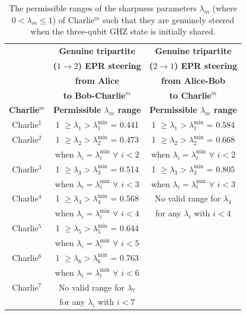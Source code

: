 \documentclass[pra,a4paper,aps,twocolumn,showpacs,superscriptaddress,groupedaddress]{revtex4}
\begin{document}
{\centering
	\begin{table}[t]\footnotesize
			\begin{tabular}{|c | c || c |} 
				\hline 
				& \textbf{Genuine tripartite} & \textbf{Genuine tripartite} \\
				& \textbf{($1 \rightarrow 2$) EPR steering} & \textbf{($2 \rightarrow 1$) EPR steering} \\
				& \textbf{from Alice} & \textbf{from Alice-Bob} \\
				& \textbf{to Bob-Charlie$^m$} & \textbf{to Charlie$^m$}\\
				\hline
				{\bf Charlie$^m$} & {\bf Permissible $\lambda_{m}$ range}  & {\bf Permissible $\lambda_{m}$ range}  \\ [0.5ex] 
				\hline
				\hline
				Charlie$^1$ & 1 $\geq \lambda_1 > \lambda_1^{\text{min}}$ = 0.441  & 1 $\geq \lambda_1 > \lambda_1^{\text{min}}$ = 0.584 \\ 
				\hline
				Charlie$^2$ & 1 $\geq \lambda_2 > \lambda_2^{\text{min}}$ = 0.473 & 1 $\geq \lambda_2 > \lambda_2^{\text{min}}$ = 0.668 \\
				& when $\lambda_i = \lambda_i^{\text{min}}$ $\forall$ $i < 2$ & when $\lambda_i = \lambda_i^{\text{min}}$ $\forall$ $i < 2$ \\
				\hline
				Charlie$^3$ & 1 $\geq \lambda_3 > \lambda_3^{\text{min}}$ = 0.514 & 1 $\geq \lambda_3 > \lambda_3^{\text{min}}$ = 0.805 \\
				& when $\lambda_i = \lambda_i^{\text{min}}$ $\forall$ $i < 3$ & when $\lambda_i = \lambda_i^{\text{min}}$ $\forall$ $i < 3$ \\
				\hline
				Charlie$^4$ & 1 $\geq \lambda_4 > \lambda_4^{\text{min}}$ = 0.568  & No valid range for $\lambda_4$ \\
				& when $\lambda_i = \lambda_i^{\text{min}}$ $\forall$ $i < 4$ & for any $\lambda_i$ with $i<4$ \\
				\hline
				Charlie$^5$ & 1 $\geq \lambda_5 > \lambda_5^{\text{min}}$ = 0.644  & \\ 
				& when $\lambda_i = \lambda_i^{\text{min}}$ $\forall$ $i < 5$ &  \\
				\hline
				Charlie$^6$ & 1 $\geq \lambda_6 > \lambda_6^{\text{min}}$ = 0.763  & \\
				& when $\lambda_i = \lambda_i^{\text{min}}$ $\forall$ $i < 6$ &  \\
				\hline
				Charlie$^7$ & No valid range for $\lambda_7$  & \\ 
				& for any $\lambda_i$ with $i<7$ & \\
				\hline
			\end{tabular}
			\caption{The permissible ranges of the sharpness parameters $\lambda_m$ (where $0 < \lambda_m \leq 1$) of Charlie$^m$ such that they are genuinely steered when the three-qubit GHZ state  is initially shared. }
			\label{tab3}
	\end{table}
} 
\end{document}
